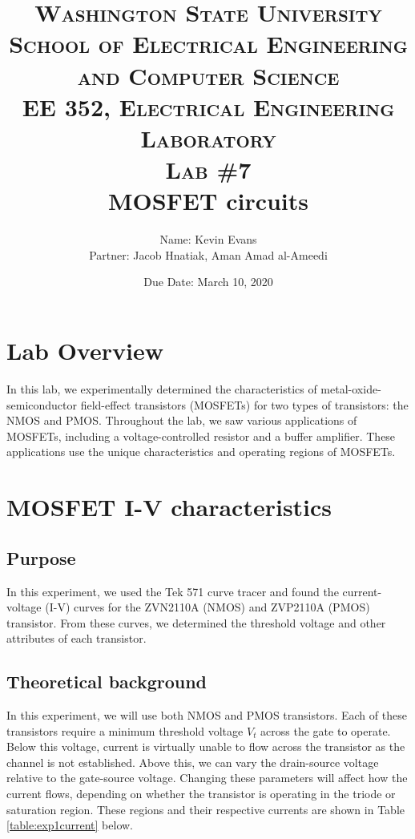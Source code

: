 \documentclass{report}
\title{
	\textsc{ \small
		Washington State University \\
		School of Electrical Engineering and Computer Science \\
		EE 352, Electrical Engineering Laboratory
	} \\
	{\textsc{\small Lab \#7}} \\
	MOSFET circuits
}
\author{
	Name: Kevin Evans \\
	Partner: Jacob Hnatiak, Aman Amad al-Ameedi
}
\date{Due Date: March 10, 2020}
\begin{document}
\maketitle

\section*{Lab Overview}
In this lab, we experimentally determined the characteristics of metal-oxide-semiconductor field-effect transistors (MOSFETs) for two types of transistors: the NMOS and PMOS. Throughout the lab, we saw various applications of MOSFETs, including a voltage-controlled resistor and a buffer amplifier. These applications use the unique characteristics and operating regions of MOSFETs.


\section{MOSFET I-V characteristics}

\subsection{Purpose}
In this experiment, we used the Tek 571 curve tracer and found the current-voltage (I-V) curves for the ZVN2110A (NMOS) and ZVP2110A (PMOS) transistor. From these curves, we determined the threshold voltage and other attributes of each transistor.

\subsection{Theoretical background}
In this experiment, we will use both NMOS and PMOS transistors. Each of these transistors require a minimum threshold voltage $V_t$ across the gate to operate. Below this voltage, current is virtually unable to flow across the transistor as the channel is not established. Above this, we can vary the drain-source voltage relative to the gate-source voltage. Changing these parameters will affect how the current flows, depending on whether the transistor is operating in the triode or saturation region. These regions and their respective currents are shown in Table \ref{table:exp1current} below.
\end{document}
